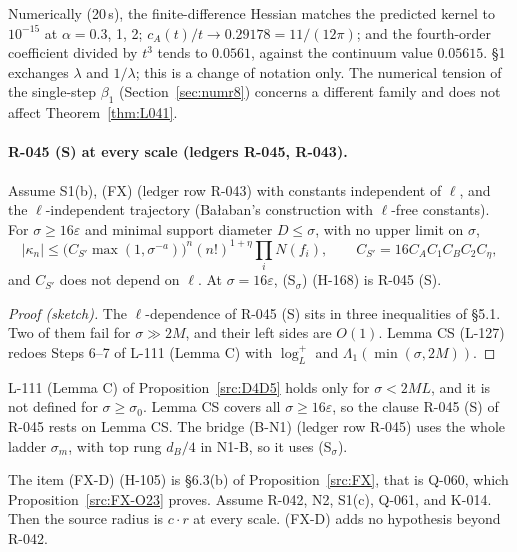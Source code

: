 Numerically (20\,s), the finite-difference Hessian matches the predicted kernel to $10^{-15}$ at $\alpha=0.3$, 1, 2; $c_A(t)/t\to0.29178=11/(12\pi)$; and the fourth-order coefficient divided by $t^3$ tends to $0.0561$, against the continuum value $0.05615$.  \S1 exchanges $\lambda$ and $1/\lambda$; this is a change of notation only. The numerical tension of the single-step $\beta_1$ (Section~\ref{sec:numr8}) concerns a different family and does not affect Theorem~\ref{thm:L041}.

\paragraph{R-045 (S) at every scale (ledgers R-045, R-043).}
\begin{proposition}\label{prop:L042}
Assume S1(b), (FX) (ledger row R-043) with constants independent of $\ell$, and the $\ell$-independent trajectory (Ba{\l}aban's construction with $\ell$-free constants). For $\sigma\ge16\varepsilon$ and minimal support diameter $D\le\sigma$, with no upper limit on $\sigma$,
\[
|\kappa_n|\le\bigl(C_{S'}\max(1,\sigma^{-a})\bigr)^n(n!)^{1+\eta}\prod_iN(f_i),\qquad C_{S'}=16C_AC_1C_BC_2C_\eta,
\]
and $C_{S'}$ does not depend on $\ell$. At $\sigma=16\varepsilon$, (S$_\sigma$) (H-168) is R-045 (S).
\end{proposition}
\begin{proof}[Proof (sketch)]
The $\ell$-dependence of R-045 (S) sits in three inequalities of  \S5.1. Two of them fail for $\sigma\gg2M$, and their left sides are $O(1)$. Lemma CS (L-127) redoes Steps 6--7 of L-111 (Lemma C) with $\log_L^+$ and $\Lambda_1(\min(\sigma,2M))$.
\end{proof}
\begin{remark}
L-111 (Lemma C) of Proposition~\ref{src:D4D5} holds only for $\sigma<2ML$, and it is not defined for $\sigma\ge\sigma_0$. Lemma CS covers all $\sigma\ge16\varepsilon$, so the clause R-045 (S) of R-045 rests on Lemma CS. The bridge (B-N1) (ledger row R-045) uses the whole ladder $\sigma_m$, with top rung $d_B/4$ in N1-B, so it uses (S$_\sigma$).
\end{remark}

\begin{proposition}\label{src:FX-D}
The item (FX-D) (H-105) is \S6.3(b) of Proposition~\ref{src:FX}, that is Q-060, which Proposition~\ref{src:FX-O23} proves. Assume R-042, N2, S1(c), Q-061, and K-014. Then the source radius is $c\cdot r$ at every scale. (FX-D) adds no hypothesis beyond R-042.
\end{proposition}


